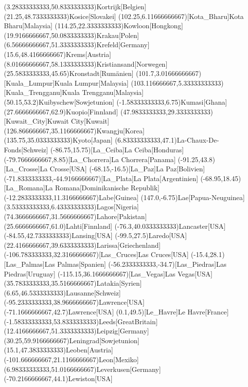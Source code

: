 \mapput(3.28333333333,50.8333333333){Kortrijk}[Belgien]
\mapput(21.25,48.7333333333){Kosice}[Slovakei]
\mapput(102.25,6.11666666667)[Kota_Bharu]{Kota Bharu}[Malaysia]
\mapput(114.25,22.3333333333){Kowloon}[Hongkong]
\mapput(19.9166666667,50.0833333333){Krakau}[Polen]
\mapput(6.56666666667,51.3333333333){Krefeld}[Germany]
\mapput(15.6,48.4166666667){Krems}[Austria]
\mapput(8.01666666667,58.1333333333){Kristiansand}[Norwegen]
\mapput(25.5833333333,45.65){Kronstadt}[Rumänien]
\mapput(101.7,3.01666666667)[Kuala_Lumpur]{Kuala Lumpur}[Malaysia]
\mapput(103.116666667,5.33333333333)[Kuala_Trengganu]{Kuala Trengganu}[Malaysia]
\mapput(50.15,53.2){Kuibyschew}[Sowjetunion]
\mapput(-1.58333333333,6.75){Kumasi}[Ghana]
\mapput(27.6666666667,62.9){Kuopio}[Finnland]
\mapput(47.9833333333,29.3333333333)[Kuwait_City]{Kuwait City}[Kuwait]
\mapput(126.866666667,35.1166666667){Kwangju}[Korea]
\mapput(135.75,35.0333333333){Kyoto}[Japan]
\mapput(6.83333333333,47.1){La-Chaux-De-Fonds}[Schweiz]
\mapput(-86.75,15.75)[La_Ceiba]{La Ceiba}[Honduras]
\mapput(-79.7666666667,8.85)[La_Chorrera]{La Chorrera}[Panama]
\mapput(-91.25,43.8)[La_Crosse]{La Crosse}[USA]
\mapput(-68.15,-16.5)[La_Paz]{La Paz}[Bolivien]
\mapput(-71.8333333333,-44.9166666667)[La_Plata]{La Plata}[Argentinien]
\mapput(-68.95,18.45)[La_Romana]{La Romana}[Dominikanische Republik]
\mapput(-12.2833333333,11.3166666667){Labe}[Guinea]
\mapput(147.0,-6.75){Lae}[Papua-Neuguinea]
\mapput(3.53333333333,6.43333333333){Lagos}[Nigeria]
\mapput(74.3666666667,31.5666666667){Lahore}[Pakistan]
\mapput(25.6666666667,61.0){Lahti}[Finnland]
\mapput(-76.3,40.0333333333){Lancaster}[USA]
\mapput(-84.55,42.7333333333){Lansing}[USA]
\mapput(-99.5,27.5){Laredo}[USA]
\mapput(22.4166666667,39.6333333333){Larissa}[Griechenland]
\mapput(-106.783333333,32.3166666667)[Las_Cruces]{Las Cruces}[USA]
\mapput(-15.4,28.1)[Las_Palmas]{Las Palmas}[Spanien]
\mapput(-56.2333333333,-34.7)[Las_Piedras]{Las Piedras}[Uruguay]
\mapput(-115.15,36.1666666667)[Las_Vegas]{Las Vegas}[USA]
\mapput(35.7833333333,35.5166666667){Latakia}[Syrien]
\mapput(6.65,46.5333333333){Lausanne}[Schweiz]
\mapput(-95.2333333333,38.9666666667){Lawrence}[USA]
\mapput(-71.1666666667,42.7){Lawrence}[USA]
\mapput(0.1,49.5)[Le_Havre]{Le Havre}[France]
\mapput(-1.58333333333,53.8333333333){Leeds}[GreatBritain]
\mapput(12.4166666667,51.3333333333){Leipzig}[Germany]
\mapput(30.25,59.9166666667){Leningrad}[Sowjetunion]
\mapput(15.1,47.3833333333){Leoben}[Austria]
\mapput(-101.666666667,21.1166666667){Leon}[Mexiko]
\mapput(6.98333333333,51.0166666667){Leverkusen}[Germany]
\mapput(-70.2166666667,44.1){Lewiston}[USA]
